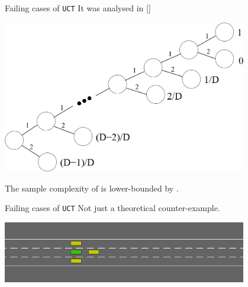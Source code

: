 \documentclass{beamer}
\begin{document}
\begin{frame}{Failing cases of \texttt{UCT}}
    It was analysed in [\cite{Coquelin2007}]
    \begin{center}
    \includegraphics[width=0.8\textwidth]{img/uct_fail}
    \end{center}
    The sample complexity of is lower-bounded by .
\end{frame}

\begin{frame}{Failing cases of \texttt{UCT}}
    Not just a theoretical counter-example.
    \begin{center}
    \includegraphics[width=0.8\textwidth]{img/uct_trap}\\
    \bigskip
    
    \end{center}
\end{frame}
\end{document}
